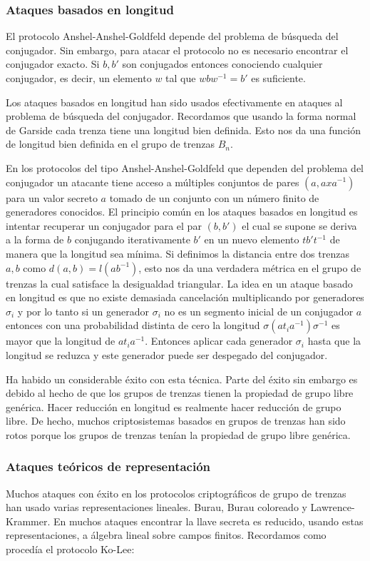 \documentclass[12pt]{article}
\theoremstyle{definition}
\begin{document}
\subsubsection{Ataques basados en longitud}
El protocolo Anshel-Anshel-Goldfeld depende del problema de búsqueda del conjugador. Sin embargo, para atacar el protocolo no es necesario encontrar el conjugador exacto. Si $b,b'$ son conjugados entonces conociendo cualquier conjugador, es decir, un elemento $w$ tal que $wbw^{-1}=b'$ es suficiente.

Los ataques basados en longitud han sido usados efectivamente en ataques al problema de búsqueda del conjugador. Recordamos que usando la forma normal de Garside cada trenza tiene una longitud bien definida. Esto nos da una función de longitud bien definida en el grupo de trenzas $B_n$.

En los protocolos del tipo Anshel-Anshel-Goldfeld que dependen del problema del conjugador un atacante tiene acceso a múltiples conjuntos de pares $(a,axa^{-1})$ para un valor secreto $a$ tomado de un conjunto con un número finito de generadores conocidos. El principio común en los ataques basados en longitud es intentar recuperar un conjugador para el par $(b,b')$ el cual se supone se deriva a la forma de $b$ conjugando iterativamente $b'$ en un nuevo elemento $tb't^{-1}$ de manera que la longitud sea mínima. Si definimos la distancia entre dos trenzas $a,b$ como $d(a,b)=l(ab^{-1})$, esto nos da una verdadera métrica en el grupo de trenzas la cual satisface la desigualdad triangular. La idea en un ataque basado en longitud es que no existe demasiada cancelación multiplicando por generadores $\sigma_i$ y por lo tanto si un generador $\sigma_i$ no es un segmento inicial de un conjugador $a$ entonces con una probabilidad distinta de cero la longitud $\sigma(at_ia^{-1})\sigma^{-1}$ es mayor que la longitud de $at_ia^{-1}$. Entonces aplicar cada generador $\sigma_i$ hasta que la longitud se reduzca y este generador puede ser despegado del conjugador.

Ha habido un considerable éxito con esta técnica. Parte del éxito sin embargo es debido al hecho de que los grupos de trenzas tienen la propiedad de grupo libre genérica. Hacer reducción en longitud es realmente hacer reducción de grupo libre. De hecho, muchos criptosistemas basados en grupos de trenzas han sido rotos porque los grupos de trenzas tenían la propiedad de grupo libre genérica.

\subsubsection{Ataques teóricos de representación}
Muchos ataques con éxito en los protocolos criptográficos de grupo de trenzas han usado varias representaciones lineales. Burau, Burau coloreado y Lawrence-Krammer. En muchos ataques encontrar la llave secreta es reducido, usando estas representaciones, a álgebra lineal sobre campos finitos. Recordamos como procedía el protocolo Ko-Lee:
\end{document}
